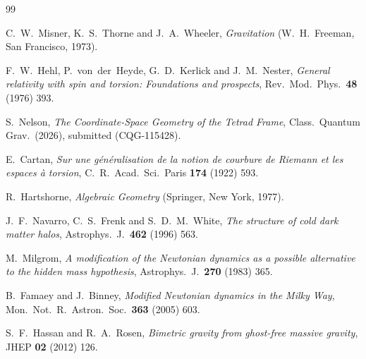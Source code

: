 \documentclass[twocolumn]{iopjournal}
\begin{document}
\begin{thebibliography}{99}

C.~W.~Misner, K.~S.~Thorne and J.~A.~Wheeler,
\textit{Gravitation}
(W.~H.~Freeman, San Francisco, 1973).

F.~W.~Hehl, P.~von~der~Heyde, G.~D.~Kerlick and
J.~M.~Nester,
\textit{General relativity with spin and torsion: Foundations
and prospects},
Rev.\ Mod.\ Phys.\ \textbf{48} (1976) 393.

S.~Nelson,
\textit{The Coordinate-Space Geometry of the Tetrad Frame},
Class.\ Quantum Grav.\ (2026), submitted (CQG-115428).

E.~Cartan,
\textit{Sur une g\'en\'eralisation de la notion de courbure de
Riemann et les espaces \`a torsion},
C.~R.\ Acad.\ Sci.\ Paris \textbf{174} (1922) 593.

R.~Hartshorne,
\textit{Algebraic Geometry}
(Springer, New York, 1977).

J.~F.~Navarro, C.~S.~Frenk and S.~D.~M.~White,
\textit{The structure of cold dark matter halos},
Astrophys.\ J.\ \textbf{462} (1996) 563.

M.~Milgrom,
\textit{A modification of the Newtonian dynamics as a possible
alternative to the hidden mass hypothesis},
Astrophys.\ J.\ \textbf{270} (1983) 365.

B.~Famaey and J.~Binney,
\textit{Modified Newtonian dynamics in the Milky Way},
Mon.\ Not.\ R.\ Astron.\ Soc.\ \textbf{363} (2005) 603.

S.~F.~Hassan and R.~A.~Rosen,
\textit{Bimetric gravity from ghost-free massive gravity},
JHEP \textbf{02} (2012) 126.

\end{thebibliography}
\end{document}
